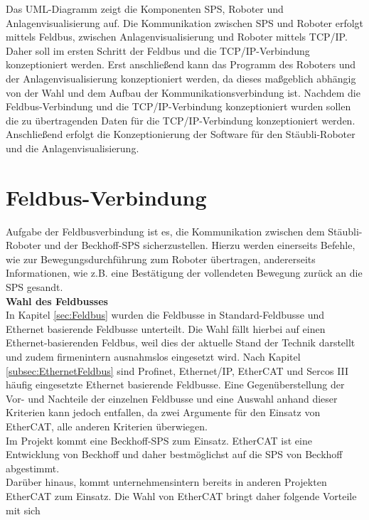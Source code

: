 \documentclass[ a4paper,
                oneside,
                toc=bibliography,
                toc=listof
                ]{scrbook}
\begin{document}
	Das UML-Diagramm zeigt die Komponenten SPS, Roboter und Anlagenvisualisierung auf. Die Kommunikation zwischen SPS und Roboter erfolgt mittels Feldbus, zwischen Anlagenvisualisierung und Roboter mittels TCP/IP. Daher soll im ersten Schritt der Feldbus und die TCP/IP-Verbindung konzeptioniert werden. Erst anschließend kann das Programm des Roboters und der Anlagenvisualisierung konzeptioniert werden, da dieses maßgeblich abhängig von der Wahl und dem Aufbau der Kommunikationsverbindung ist. Nachdem die Feldbus-Verbindung und die TCP/IP-Verbindung konzeptioniert wurden sollen die zu übertragenden Daten für die TCP/IP-Verbindung konzeptioniert werden. Anschließend erfolgt die Konzeptionierung der Software für den Stäubli-Roboter und die Anlagenvisualisierung.
	 
	\section{Feldbus-Verbindung}
	\label{sec:KonzeptFeldbus}
	Aufgabe der Feldbusverbindung ist es, die Kommunikation zwischen dem Stäubli-Roboter und der Beckhoff-SPS sicherzustellen. Hierzu werden einerseits Befehle, wie zur Bewegungsdurchführung zum Roboter übertragen, andererseits Informationen, wie z.B. eine Bestätigung der vollendeten Bewegung zurück an die SPS gesandt.\\
	\textbf{Wahl des Feldbusses}\\
	In Kapitel \ref{sec:Feldbus} wurden die Feldbusse in Standard-Feldbusse und Ethernet basierende Feldbusse unterteilt. Die Wahl fällt hierbei auf einen Ethernet-basierenden Feldbus, weil dies der aktuelle Stand der Technik darstellt und zudem firmenintern ausnahmslos eingesetzt wird. Nach Kapitel \ref{subsec:EthernetFeldbus} sind Profinet, Ethernet/IP, EtherCAT und Sercos III häufig eingesetzte Ethernet basierende Feldbusse. Eine Gegenüberstellung der Vor- und Nachteile der einzelnen Feldbusse und eine Auswahl anhand dieser Kriterien kann jedoch entfallen, da zwei Argumente für den Einsatz von EtherCAT, alle anderen Kriterien überwiegen.\\
	Im Projekt kommt eine Beckhoff-SPS zum Einsatz. EtherCAT ist eine Entwicklung von Beckhoff und daher bestmöglichst auf die SPS von Beckhoff abgestimmt.\\
	Darüber hinaus, kommt unternehmensintern bereits in anderen Projekten EtherCAT zum Einsatz. Die Wahl von EtherCAT bringt daher folgende Vorteile mit sich
\end{document}
